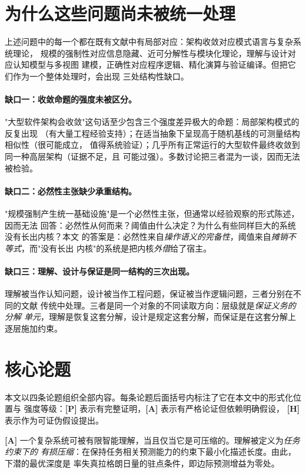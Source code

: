 \section{为什么这些问题尚未被统一处理}

上述问题中的每一个都在既有文献中有局部对应：架构收敛对应模式语言与复杂系统理论，
规模的强制性对应信息隐藏、近可分解性与模块化理论，理解与设计对应认知模型与多视图
建模，正确性对应程序逻辑、精化演算与验证编译。但把它们作为一个整体处理时，会出现
三处结构性缺口。

\paragraph{缺口一：收敛命题的强度未被区分。}
"大型软件架构会收敛"这句话至少包含三个强度差异极大的命题：局部架构模式的反复出现
（有大量工程经验支持）；在适当抽象下呈现高于随机基线的可测量结构相似性（很可能成立，
值得系统验证）；几乎所有正常运行的大型软件最终收敛到同一种高层架构（证据不足，且
可能过强）。多数讨论把三者混为一谈，因而无法被检验。

\paragraph{缺口二：必然性主张缺少承重结构。}
"规模强制产生统一基础设施"是一个必然性主张，但通常以经验观察的形式陈述，因而无法
回答：必然性从何而来？阈值由什么决定？为什么有些同样巨大的系统没有长出内核？本文
的答案是：必然性来自\emph{操作语义的完备性}，阈值来自\emph{摊销不等式}，而"没有长出
内核"的系统是把内核\emph{外借}给了宿主。

\paragraph{缺口三：理解、设计与保证是同一结构的三次出现。}
理解被当作认知问题，设计被当作工程问题，保证被当作逻辑问题，三者分别在不同的文献
传统中处理。三者是同一个对象的不同读取方向：层级就是\emph{保证义务的分解
单元}，理解是恢复这套分解，设计是规定这套分解，而保证是在这套分解上逐层施加约束。

\section{核心论题}

本文以四条论题组织全部内容。每条论题后面括号内标注了它在本文中的形式化位置与
强度等级：\textbf{[P]} 表示有完整证明，\textbf{[A]} 表示有严格论证但依赖明确假设，
\textbf{[H]} 表示作为可证伪假设提出。

\begin{principle}[压缩论题]\label{th:compression}\textbf{[A]}
一个复杂系统可被有限智能理解，当且仅当它是可压缩的。理解被定义为\emph{任务约束下的
有损压缩}：在保持任务相关预测能力的约束下最小化描述长度。由此，下潜的最优深度是
率失真拉格朗日量的驻点条件，即边际预测增益为零处。
\end{principle}

